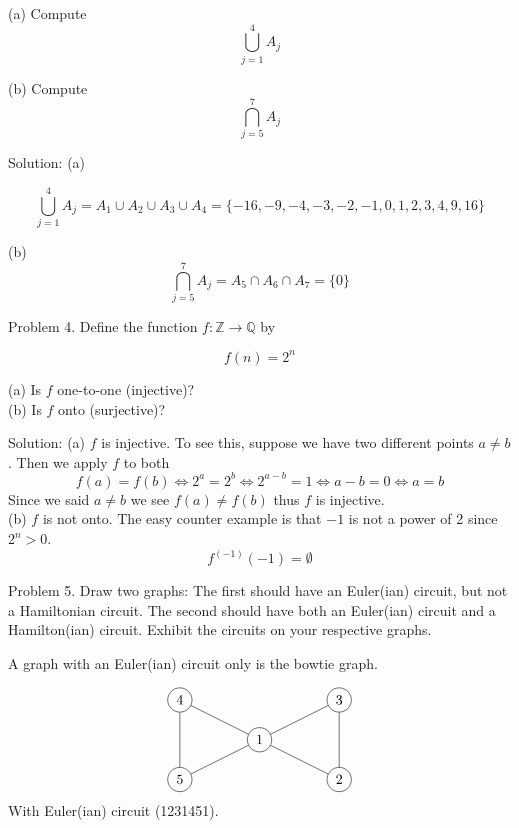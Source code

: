 \documentclass[16 pt]{amsart}
\theoremstyle{definition}
\theoremstyle{remark}
\numberwithin{equation}{subsection}
\newcommand{\Z}{\mathbb{Z}}
\newcommand{\Q}{\mathbb{Q}}
\begin{document}
(a) Compute
\[
\bigcup_{j=1}^{4}A_j
\]

(b) Compute
\[
\bigcap_{j=5}^7 A_j
\]

\vspace{1in}

Solution: (a) 

\[
\bigcup_{j=1}^{4}A_j = A_1\cup A_2\cup A_3 \cup A_4 = \{-16,-9,-4,-3,-2,-1,0,1,2,3,4,9,16\}
\]

(b)
\[
\bigcap_{j=5}^7 A_j = A_5\cap A_6 \cap A_7 = \{0\}
\]

\newpage

Problem 4. Define the function $f:\Z\rightarrow \Q$ by

\[
f(n) = 2^n
\]

(a) Is $f$ one-to-one (injective)?\\

(b) Is $f$ onto (surjective)?\\

\vspace{1in}

Solution:
(a) $f$ is injective.  To see this, suppose we have two different points $a\ne b$. Then we apply $f$ to both
\[
f(a) = f(b) \iff 2^a = 2^b \iff 2^{a-b} = 1 \iff a-b = 0\iff a=b
\]
Since we said $a\ne b$ we see $f(a)\ne f(b)$ thus $f$ is injective.\\

(b) $f$ is not onto.  The easy counter example is that $-1$ is not a power of 2 since $2^n > 0$.
\[
f^{(-1)}(-1) = \emptyset 
\]




\newpage

Problem 5. Draw two graphs: The first should have an Euler(ian) circuit, but not a Hamiltonian circuit.  The second should have both an Euler(ian) circuit and a Hamilton(ian) circuit.  Exhibit the circuits on your respective graphs.

\vspace{1in}

A graph with an Euler(ian) circuit only is the bowtie graph.

\[
\begin{tikzpicture}
\node[circle,draw] (1) at (0,0){1};
\node[circle,draw] (2) at (2,-1){2};
\node[circle,draw] (3) at (2,1){3};
\node[circle,draw] (4) at (-2,1){4};
\node[circle,draw] (5) at (-2,-1){5};
\foreach \from/\to in {1/2,1/3,1/4,1/5,2/3,4/5}
  \draw (\from) -- (\to);
\end{tikzpicture}
\]
With Euler(ian) circuit (1231451).
\end{document}
